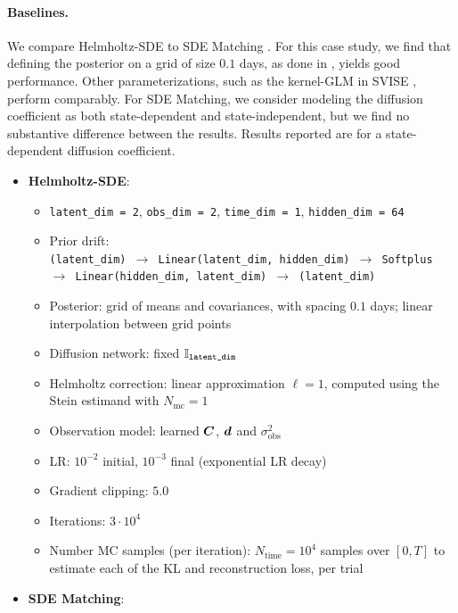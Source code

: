 \paragraph{Baselines.}
We compare Helmholtz-SDE to SDE Matching \cite{bartosh2025sde}. For this case study, we find that defining the posterior on a grid of size $0.1$ days, as done in , yields good performance. Other parameterizations, such as the kernel-GLM in SVISE \cite{course2023state}, perform comparably. 
For SDE Matching, we consider modeling the diffusion coefficient as both state-dependent and state-independent, but we find no substantive difference between the results. Results reported are for a state-dependent diffusion coefficient.

\begin{itemize}
    \item \textbf{Helmholtz-SDE}:
    \begin{itemize}
        \item \texttt{latent\_dim = 2}, \texttt{obs\_dim = 2},  \texttt{time\_dim = 1}, \texttt{hidden\_dim = 64}
        \item 
        Prior drift:\\
        \texttt{(latent\_dim) $\to$ Linear(latent\_dim, hidden\_dim) $\to$ Softplus $\to$ Linear(hidden\_dim, latent\_dim) $\to$ (latent\_dim)}
        \item Posterior: grid of means and covariances, with spacing $0.1$ days; linear interpolation between grid points
        \item Diffusion network: fixed $\mathbb{I}_{\texttt{latent\_dim}}$
        \item Helmholtz correction: linear approximation $\ell = 1$, computed using the Stein estimand with $N_{\mathrm{mc}} = 1$
        \item Observation model: learned $\boldsymbol{C}$, $\boldsymbol{d}$ and $\sigma_{\mathrm{obs}}^2$
        \item LR: $10^{-2}$ initial, $10^{-3}$ final (exponential LR decay)
        \item Gradient clipping: $5.0$
        \item Iterations: $3 \cdot 10^4$
        \item Number MC samples (per iteration): $N_{\mathrm{time}} = 10^4$ samples over $[0, T]$ to estimate each of the KL and reconstruction loss, per trial
    \end{itemize}
    \item \textbf{SDE Matching}:
    \begin{itemize}

\end{itemize}
\end{itemize}
